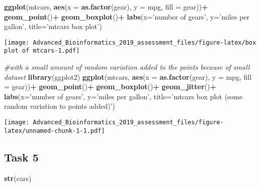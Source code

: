 \documentclass[]{article}
\newenvironment{Shaded}{\begin{snugshade}}{\end{snugshade}}
\newcommand{\KeywordTok}[1]{\textcolor[rgb]{0.13,0.29,0.53}{\textbf{#1}}}
\newcommand{\DataTypeTok}[1]{\textcolor[rgb]{0.13,0.29,0.53}{#1}}
\newcommand{\StringTok}[1]{\textcolor[rgb]{0.31,0.60,0.02}{#1}}
\newcommand{\CommentTok}[1]{\textcolor[rgb]{0.56,0.35,0.01}{\textit{#1}}}
\newcommand{\OperatorTok}[1]{\textcolor[rgb]{0.81,0.36,0.00}{\textbf{#1}}}
\newcommand{\NormalTok}[1]{#1}
\begin{document}
\begin{Shaded}
\begin{Highlighting}[]
\KeywordTok{ggplot}\NormalTok{(mtcars, }\KeywordTok{aes}\NormalTok{(}\DataTypeTok{x =} \KeywordTok{as.factor}\NormalTok{(gear), }\DataTypeTok{y =}\NormalTok{ mpg, }\DataTypeTok{fill =}\NormalTok{ gear))}\OperatorTok{+}
\StringTok{  }\KeywordTok{geom_point}\NormalTok{()}\OperatorTok{+}
\StringTok{  }\KeywordTok{geom_boxplot}\NormalTok{()}\OperatorTok{+}
\StringTok{  }\KeywordTok{labs}\NormalTok{(}\DataTypeTok{x=}\StringTok{'number of gears'}\NormalTok{, }\DataTypeTok{y=}\StringTok{'miles per gallon'}\NormalTok{, }\DataTypeTok{title=}\StringTok{'mtcars box plot'}\NormalTok{)}
\end{Highlighting}
\end{Shaded}

\texttt{[image: Advanced\_Bioinformatics\_2019\_assessment\_files/figure-latex/box plot of mtcars-1.pdf]}

\begin{Shaded}
\begin{Highlighting}[]
\CommentTok{#with a small amount of random variation added to the points because of small dataset}
\KeywordTok{library}\NormalTok{(ggplot2)}
\KeywordTok{ggplot}\NormalTok{(mtcars, }\KeywordTok{aes}\NormalTok{(}\DataTypeTok{x =} \KeywordTok{as.factor}\NormalTok{(gear), }\DataTypeTok{y =}\NormalTok{ mpg, }\DataTypeTok{fill =}\NormalTok{ gear))}\OperatorTok{+}
\StringTok{  }\KeywordTok{geom_point}\NormalTok{()}\OperatorTok{+}
\StringTok{  }\KeywordTok{geom_boxplot}\NormalTok{()}\OperatorTok{+}
\StringTok{  }\KeywordTok{geom_jitter}\NormalTok{()}\OperatorTok{+}
\StringTok{  }\KeywordTok{labs}\NormalTok{(}\DataTypeTok{x=}\StringTok{'number of gears'}\NormalTok{, }\DataTypeTok{y=}\StringTok{'miles per gallon'}\NormalTok{, }\DataTypeTok{title=}\StringTok{'mtcars box plot (some random variation to points added)'}\NormalTok{)}
\end{Highlighting}
\end{Shaded}

\texttt{[image: Advanced\_Bioinformatics\_2019\_assessment\_files/figure-latex/unnamed-chunk-1-1.pdf]}

\subsection{Task 5}\label{task-5}

\begin{Shaded}
\begin{Highlighting}[]
\KeywordTok{str}\NormalTok{(cars)}
\end{Highlighting}
\end{Shaded}
\end{document}
